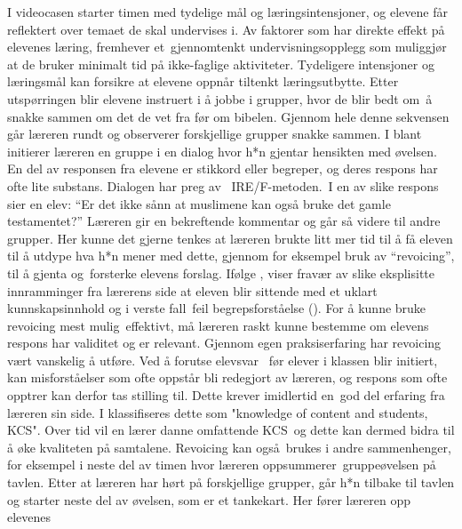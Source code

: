 \documentclass[12pt,twoside,onecolumn,norsk]{article}
\begin{document}
I videocasen starter timen med tydelige mål og læringsintensjoner, og elevene får reflektert 
over temaet de skal undervises i. Av faktorer som har direkte effekt på elevenes læring, 
fremhever  et gjennomtenkt undervisningsopplegg som muliggjør at de bruker 
minimalt tid på ikke-faglige aktiviteter. Tydeligere intensjoner og læringsmål kan forsikre 
at elevene oppnår tiltenkt læringsutbytte.
\newline
\newline
Etter utspørringen blir elevene instruert i å jobbe i grupper, hvor de blir bedt om å 
snakke sammen om det de vet fra før om bibelen. Gjennom hele denne sekvensen går læreren 
rundt og observerer forskjellige grupper snakke sammen. I blant initierer læreren en 
gruppe i en dialog hvor h*n gjentar hensikten med øvelsen. En del av responsen fra 
elevene er stikkord eller begreper, og deres respons har ofte lite substans. Dialogen 
har preg av  IRE/F-metoden. I en av slike respons sier en elev: ``Er det ikke sånn at 
muslimene kan også bruke det gamle testamentet?'' Læreren gir en bekreftende kommentar 
og går så videre til andre grupper. Her kunne det gjerne tenkes at læreren brukte litt 
mer tid til å få eleven til å utdype hva h*n mener med dette, gjennom for eksempel bruk 
av ``revoicing'', til å gjenta og forsterke elevens forslag. Ifølge , 
viser fravær av slike eksplisitte innramminger fra lærerens side at eleven blir 
sittende med et uklart kunnskapsinnhold og i verste fall feil begrepsforståelse 
(). For å kunne bruke revoicing mest mulig effektivt, må 
læreren raskt kunne bestemme om elevens respons har validitet og er relevant. Gjennom 
egen praksiserfaring har revoicing vært vanskelig å utføre. Ved å forutse elevsvar 
før elever i klassen blir initiert, kan misforståelser som ofte oppstår bli redegjort 
av læreren, og respons som ofte opptrer kan derfor tas stilling til. Dette krever 
imidlertid en god del erfaring fra læreren sin side. I  
klassifiseres dette som "knowledge of content and students, KCS". Over tid vil en 
lærer danne omfattende KCS og dette kan dermed bidra til å øke kvaliteten på samtalene. 
Revoicing kan også brukes i andre sammenhenger, for eksempel i neste del av timen hvor 
læreren oppsummerer gruppeøvelsen på tavlen.
\newline
\newline
Etter at læreren har hørt på forskjellige grupper, går h*n tilbake til tavlen og 
starter neste del av øvelsen, som er et tankekart. Her fører læreren opp elevenes 
\end{document}
